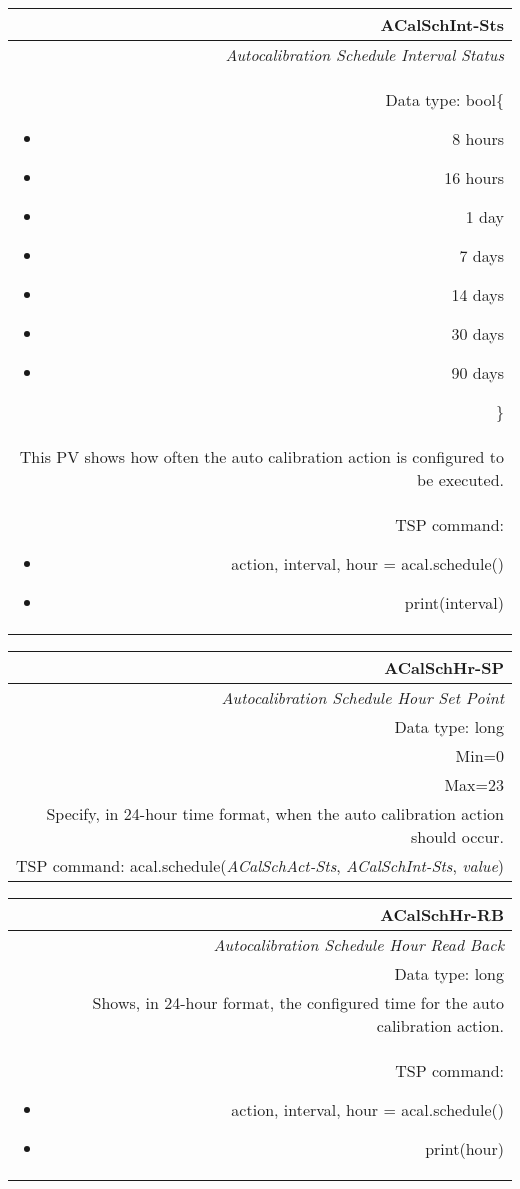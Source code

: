 \documentclass[openany]{article}
\begin{document}
		\begin{tabular}{N}
			\hline
			\bfseries ACalSchInt-Sts\label{pv:acalschint-sts} \\ \hline
			\emph{Autocalibration Schedule Interval Status} \\
			Data type: bool\{\begin{itemize}[noitemsep]
				\small
				\item[] 8 hours
				\item[] 16 hours
				\item[] 1 day
				\item[] 7 days
				\item[] 14 days
				\item[] 30 days
				\item[] 90 days
			\end{itemize}\} \\
			This PV shows how often the auto calibration action is configured to be executed. \\
			TSP command: \begin{itemize} \item[] action, interval, hour = acal.schedule() \item[] print(interval) \end{itemize}
		\end{tabular}

		\begin{tabular}{N}
			\hline
			\bfseries ACalSchHr-SP\label{pv:acalschhr-sp} \\ \hline
			\emph{Autocalibration Schedule Hour Set Point} \\
			Data type: long \\
			Min=0 \\
			Max=23 \\
			Specify, in 24-hour time format, when the auto calibration action should occur. \\
			TSP command: acal.schedule(\emph{ACalSchAct-Sts}, \emph{ACalSchInt-Sts}, \emph{value})
		\end{tabular}

		\begin{tabular}{N}
			\hline
			\bfseries ACalSchHr-RB\label{pv:acalschhr-rb} \\ \hline
			\emph{Autocalibration Schedule Hour Read Back} \\
			Data type: long \\
			Shows, in 24-hour format, the configured time for the auto calibration action. \\
			TSP command: \begin{itemize} \item[] action, interval, hour = acal.schedule() \item[] print(hour) \end{itemize}
		\end{tabular}
\end{document}
